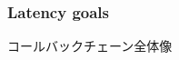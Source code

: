 

\subsubsection{Latency goals}
\label{sssec: latency goals}

\begin{frame}{コールバックチェーン全体像}
\end{frame}



